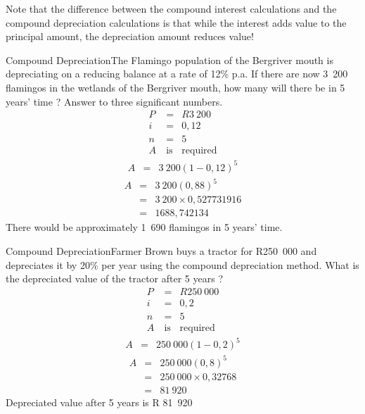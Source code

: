 Note that the difference between the compound interest calculations and the compound depreciation calculations is that while the interest adds value to the principal amount, the depreciation amount reduces value!

\begin{wex}{Compound Depreciation}{The Flamingo population of the Bergriver mouth is depreciating on a reducing balance at a rate of 12\% p.a. If there are now 3~200 flamingos in the wetlands of the Bergriver mouth, how many will there be in 5 years' time ? Answer to three significant numbers.}{
\begin{eqnarray*}
P &=& R3~200\\
i &=& 0,12\\
n &=& 5\\
A~ &\mbox{is}& \mbox{required}
\end{eqnarray*}
\begin{eqnarray*}
A &=& 3~200(1-0,12)^5
\end{eqnarray*}
\begin{eqnarray*}
A &=& 3~200(0,88)^5\\
&=&3~200\times 0,527731916\\
&=& 1688,742134
\end{eqnarray*}
}
There would be approximately 1~690 flamingos in 5 years' time.
\end{wex}

\begin{wex}{Compound Depreciation}{Farmer Brown buys a tractor for R250~000 and depreciates it by 20\% per year using the compound depreciation method. What is the depreciated value of the tractor after 5 years ?}{
\begin{eqnarray*}
P &=& R250~000\\
i &=& 0,2\\
n &=& 5\\
A~ &\mbox{is}& \mbox{required}
\end{eqnarray*}
\begin{eqnarray*}
A &=& 250~000(1-0,2)^5
\end{eqnarray*}
\begin{eqnarray*}
A &=& 250~000(0,8)^5\\
&=&250~000\times 0,32768\\
&=&81~920
\end{eqnarray*}
Depreciated value after 5 years is R 81~920}
\end{wex}

